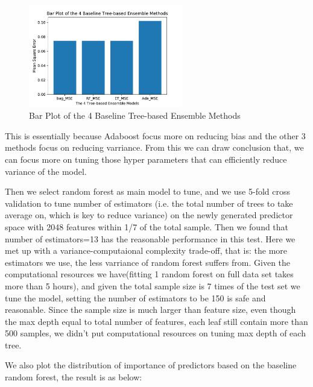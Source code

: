 \documentclass[11pt]{article}
\begin{document}
\begin{enumerate}
\begin{enumerate}
\begin{figure}[h]
\centering
\includegraphics[width=0.6\textwidth]{MSE_ensemble}
\caption{Bar Plot of the 4 Baseline Tree-based Ensemble Methods}
\label{fig:MSE_ensemble}
\end{figure}


This is essentially because Adaboost focus more on reducing bias and the other 3 methods focus on reducing varriance. From this we can draw conclusion that, we can focus more on tuning those hyper parameters that can efficiently reduce variance of the model. 

Then we select random forest as main model to tune, and we use 5-fold cross validation to tune number of estimators (i.e. the total number of trees to take average on, which is key to reduce variance) on the newly generated predictor space with 2048 features within 1/7 of the total sample. Then we found that number of estimators=13 has the reasonable performance in this test. Here we met up with a variance-computaional complexity trade-off, that is: the more estimators we use, the less varriance of random forest suffers from. Given the computational resources we have(fitting 1 random forest on full data set takes more than 5 hours), and given the total sample size is 7 times of the test set we tune the model, setting the number of estimators to be 150 is safe and reasonable. Since the sample size is much larger than feature size, even though the max depth equal to total number of features, each leaf still contain more than 500 samples, we didn't put computational resources on tuning max depth of each tree.

We also plot the distribution of importance of predictors based on the baseline random forest, the result is as below:


\end{enumerate}
\end{enumerate}
\end{document}
